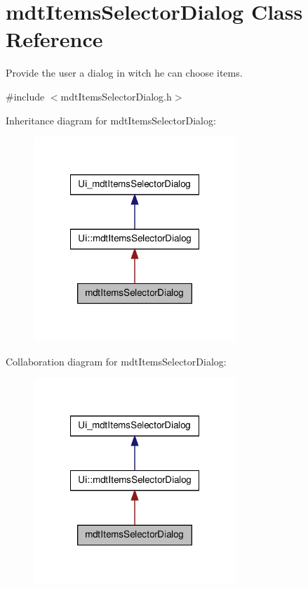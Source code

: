 \hypertarget{classmdt_items_selector_dialog}{
\section{mdtItemsSelectorDialog Class Reference}
\label{classmdt_items_selector_dialog}
}


Provide the user a dialog in witch he can choose items.  




{\ttfamily \#include $<$mdtItemsSelectorDialog.h$>$}



Inheritance diagram for mdtItemsSelectorDialog:\nopagebreak
\begin{figure}[H]
\begin{center}
\leavevmode
\includegraphics[width=216pt]{classmdt_items_selector_dialog__inherit__graph}
\end{center}
\end{figure}


Collaboration diagram for mdtItemsSelectorDialog:\nopagebreak
\begin{figure}[H]
\begin{center}
\leavevmode
\includegraphics[width=216pt]{classmdt_items_selector_dialog__coll__graph}
\end{center}
\end{figure}
